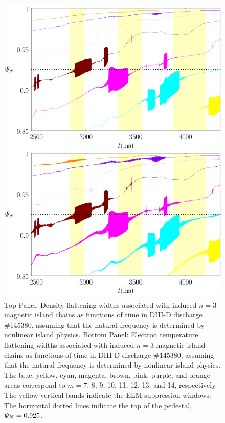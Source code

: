 \documentclass[12pt,prb,aps]{revtex4-1}
\begin{document}
\begin{figure}
\includegraphics[height=6in]{fig7.pdf}
\caption{Top Panel: Density flattening widths associated with induced $n=3$ magnetic island  chains as functions of time
in   DIII-D discharge \#145380, assuming that the natural frequency is determined by nonlinear island physics.
Bottom Panel:  Electron temperature flattening widths associated with induced $n=3$ magnetic island chains as functions of time
in   DIII-D discharge \#145380, assuming that the natural frequency is determined by nonlinear island physics. The blue, yellow, cyan, magenta, brown, pink,
purple, and orange  areas correspond to $m=7$, 8, 9, 10, 11, 12, 13, and 14, respectively. The yellow vertical bands indicate the ELM-suppression windows. 
The horizontal dotted lines indicate the top of the pedestal, ${\mit\Psi}_N=0.925$.} \label{fig7}
\end{figure}
\end{document}
